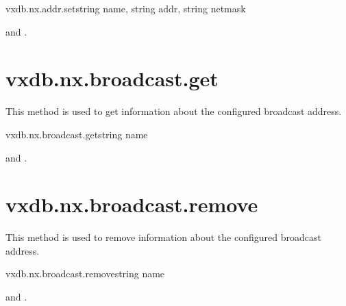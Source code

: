 \begin{rpcsynopsis}{vxdb.nx.addr.set}{string name, string addr, string netmask}
\end{rpcsynopsis}

\begin{rpcaccess}
 and \rpcownerchecks.
\end{rpcaccess}

\rpcreturnnil

\rpcnoerrors


\section{vxdb.nx.broadcast.get}

This method is used to get information about the configured broadcast address.

\begin{rpcsynopsis}{vxdb.nx.broadcast.get}{string name}
\end{rpcsynopsis}

\begin{rpcaccess}
 and \rpcownerchecks.
\end{rpcaccess}


\rpcnoerrors


\section{vxdb.nx.broadcast.remove}

This method is used to remove information about the configured broadcast
address.

\begin{rpcsynopsis}{vxdb.nx.broadcast.remove}{string name}
\end{rpcsynopsis}

\begin{rpcaccess}
 and \rpcownerchecks.
\end{rpcaccess}

\rpcreturnnil

\rpcnoerrors


